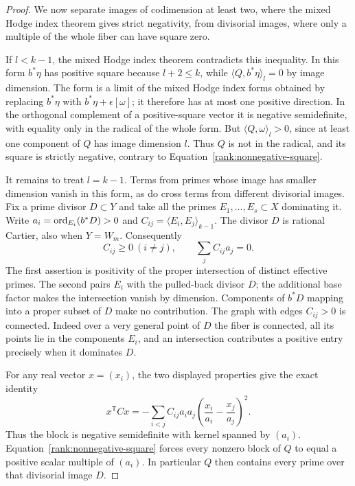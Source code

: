 \begin{proof}
We now separate images of codimension at least two, where the mixed Hodge
index theorem gives strict negativity, from divisorial images, where only
a multiple of the whole fiber can have square zero.

If \(l<k-1\), the mixed Hodge index theorem contradicts this
inequality.  In this form \(b^*\eta\) has positive square because
\(l+2\leq k\), while
\(\langle Q,b^*\eta\rangle_l=0\) by image dimension.  The form is
a limit of the mixed Hodge index forms obtained by replacing
\(b^*\eta\) with \(b^*\eta+\epsilon[\omega]\); it therefore has
at most one positive direction.  In the orthogonal complement
of a positive-square vector it is negative semidefinite, with
equality only in the radical of the whole form.  But
\(\langle Q,\omega\rangle_l>0\), since at least one component of
\(Q\) has image dimension \(l\).  Thus \(Q\) is not in the radical,
and its square is strictly negative, contrary to
Equation~\eqref{rank:nonnegative-square}.

It remains to treat \(l=k-1\).  Terms from primes whose image has
smaller dimension vanish in this form, as do cross terms from
different divisorial images.  Fix a prime divisor \(D\subset Y\)
and take all the primes \(E_1,\ldots,E_s\subset X\) dominating it.
Write \(a_i=\operatorname{ord}_{E_i}(b^*D)>0\) and
\(C_{ij}=\langle E_i,E_j\rangle_{k-1}\).
The divisor \(D\) is rational Cartier, also when \(Y=W_m\).
Consequently
\[
       C_{ij}\geq0\ (i\ne j),\qquad
       \sum_j C_{ij}a_j=0.
\]
The first assertion is positivity of the proper intersection of
distinct effective primes.  The second pairs \(E_i\) with the
pulled-back divisor \(D\); the additional base factor makes the
intersection vanish by dimension.  Components of \(b^*D\)
mapping into a proper subset of \(D\) make no contribution.
The graph with edges \(C_{ij}>0\) is connected.  Indeed over a
very general point of \(D\) the fiber is connected, all its points
lie in the components \(E_i\), and an intersection contributes a
positive entry precisely when it dominates \(D\).

For any real vector \(x=(x_i)\), the two displayed properties give
the exact identity
\[
 x^{\mathsf T}Cx
   =-\sum_{i<j}C_{ij}a_i a_j
             \left(\frac{x_i}{a_i}-\frac{x_j}{a_j}\right)^2.
\]
Thus the block is negative semidefinite with kernel spanned by
\((a_i)\).  Equation~\eqref{rank:nonnegative-square} forces every
nonzero block of \(Q\) to equal a positive scalar multiple of
\((a_i)\).  In particular \(Q\) then contains every prime over
that divisorial image \(D\).


\end{proof}
